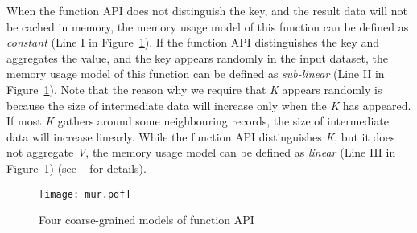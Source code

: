 When the function API does not distinguish the key, and the result data will not be cached in memory, the memory usage model of this function can be defined as \textit{constant} (Line I in Figure~\ref{fig:mur}). If the function API distinguishes the key and aggregates the value, and the key appears randomly in the input dataset, the memory usage model of this function can be defined as \textit{sub-linear} (Line II in Figure~\ref{fig:mur}). 
Note that the reason why we require that \textit{K} appears randomly is because the size of intermediate data will increase only when the \textit{K} has appeared. If most \textit{K} gathers around some neighbouring records, the size of intermediate data will increase linearly. While the function API distinguishes \textit{K}, but it does not aggregate \textit{V}, the memory usage model can be defined as \textit{linear} (Line III in Figure~\ref{fig:mur}) (see ~\cite{full} for details).

\begin{figure}[!t]
\centering
\texttt{[image: mur.pdf]}
\vspace{-2mm}
\caption{Four coarse-grained models of function API}
\vspace{-6mm}
\label{fig:mur}
\end{figure}

